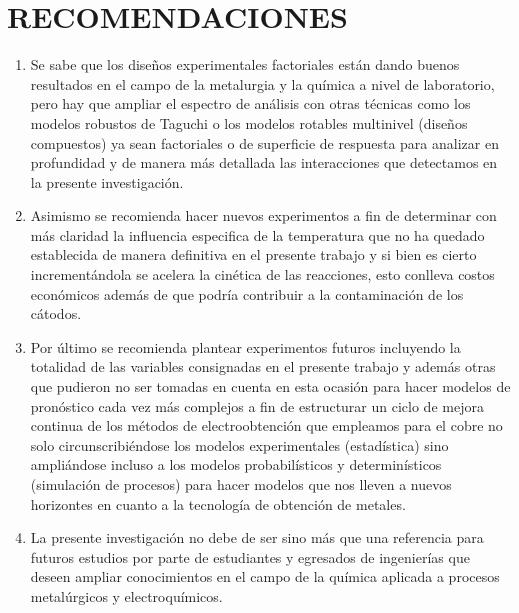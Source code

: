 \chapter{RECOMENDACIONES}

\begin{enumerate}
 \item Se sabe que los dise\~nos experimentales factoriales est\'an dando buenos resultados en el campo de la metalurgia y la qu\'imica a nivel de laboratorio, pero hay que ampliar el espectro de an\'alisis con otras t\'ecnicas como los modelos robustos de Taguchi o los modelos rotables multinivel (dise\~nos compuestos) ya sean factoriales o de superficie de respuesta para analizar en profundidad y de manera m\'as detallada las interacciones que detectamos en la presente investigaci\'on.
 \item Asimismo se recomienda hacer nuevos experimentos a fin de determinar con m\'as claridad la influencia especifica de la temperatura que no ha quedado establecida de manera definitiva en el presente trabajo y si bien es cierto increment\'andola se acelera la cin\'etica de las reacciones, esto conlleva costos econ\'omicos adem\'as de que podría contribuir a la contaminaci\'on de los c\'atodos.
 \item  Por \'ultimo se recomienda plantear experimentos futuros incluyendo la totalidad de las variables consignadas en el presente trabajo y adem\'as otras que pudieron no ser tomadas en cuenta en esta ocasi\'on para hacer modelos de pron\'ostico cada vez m\'as complejos a fin de estructurar un ciclo de mejora continua de los m\'etodos de electroobtenci\'on que empleamos para el cobre no solo circunscribi\'endose  los modelos experimentales (estad\'istica) sino ampli\'andose incluso a los modelos probabil\'isticos y determin\'isticos (simulaci\'on de procesos) para hacer modelos que nos lleven a nuevos horizontes en cuanto a la tecnolog\'ia de obtenci\'on de metales.
 \item  La presente investigaci\'on no debe de ser sino m\'as que una referencia para futuros estudios por parte de estudiantes y egresados de ingenier\'ias que deseen ampliar conocimientos en el campo de la qu\'imica aplicada a procesos metal\'urgicos y electroqu\'imicos.
\end{enumerate}
